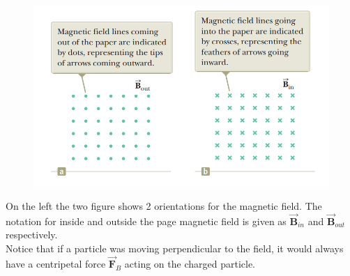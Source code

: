 \documentclass[12pt, titlepage, oneside]{article}
\let\oldvec\vec
\renewcommand{\vec}[1]{\oldvec{\bm{#1}}}
\begin{document}
\begin{figure}
\begin{center}
	\vspace{-1.1cm}
	\includegraphics[scale=0.6]{1.png}
\end{center}
\end{figure}
On the left the two figure shows 2 orientations for the magnetic field. The notation for inside and outside the page magnetic field is given as $\vec{B}_{in}$ and $\vec{B}_{out}$ respectively. \\

Notice that if a particle was moving perpendicular to the field, it would always have a centripetal force $\vec{F}_{B}$ acting on the charged particle.\newpage
\end{document}

